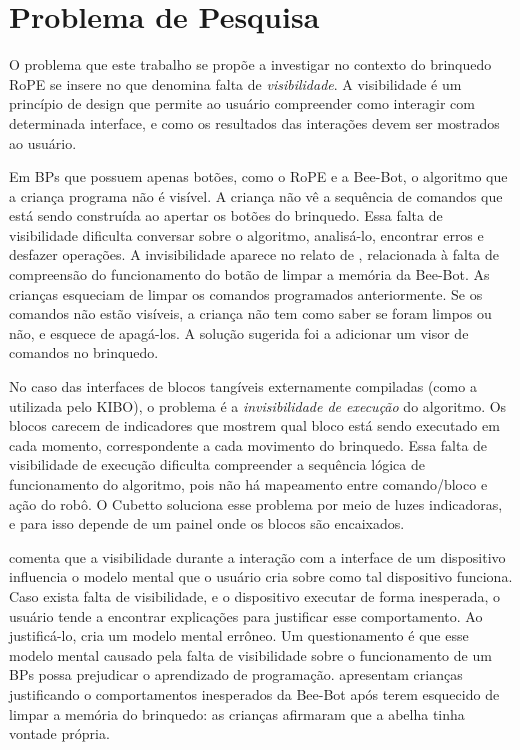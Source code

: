 \section{Problema de Pesquisa} \label{s_cintro_problema_pesquisa}

O problema que este trabalho se propõe a investigar no contexto do brinquedo RoPE se insere no que  denomina falta de \textit{visibilidade}. A visibilidade é um princípio de design que permite ao usuário compreender como interagir com determinada interface, e como os resultados das interações devem ser mostrados ao usuário.

Em BPs que possuem apenas botões, como o RoPE e a Bee-Bot, o algoritmo que a criança programa não é visível. A criança não vê a sequência de comandos que está sendo construída ao apertar os botões do brinquedo. Essa falta de visibilidade dificulta conversar sobre o algoritmo, analisá-lo, encontrar erros e desfazer operações. A invisibilidade aparece no relato de , relacionada à falta de compreensão do funcionamento do botão de limpar a memória da Bee-Bot. As crianças esqueciam de limpar os comandos programados anteriormente. Se os comandos não estão visíveis, a criança não tem como saber se foram limpos ou não, e esquece de apagá-los. A solução sugerida foi a adicionar um visor de comandos no brinquedo.

No caso das interfaces de blocos tangíveis externamente compiladas (como a utilizada pelo KIBO), o problema é a \textit{invisibilidade de execução} do algoritmo. Os blocos carecem de indicadores que mostrem qual bloco está sendo executado em cada momento, correspondente a cada movimento do brinquedo. Essa falta de visibilidade de execução dificulta compreender a sequência lógica de funcionamento do algoritmo, pois não há mapeamento entre comando/bloco e ação do robô. O Cubetto soluciona esse problema por meio de luzes indicadoras, e para isso depende de um painel onde os blocos são encaixados.

 comenta que a visibilidade durante a interação com a interface de um dispositivo influencia o modelo mental que o usuário cria sobre como tal dispositivo funciona. Caso exista falta de visibilidade, e o dispositivo executar de forma inesperada, o usuário tende a encontrar explicações para justificar esse comportamento. Ao justificá-lo, cria um modelo mental errôneo. Um questionamento é que esse modelo mental causado pela falta de visibilidade sobre o funcionamento de um BPs possa prejudicar o aprendizado de programação.  apresentam crianças justificando o comportamentos inesperados da Bee-Bot após terem esquecido de limpar a memória do brinquedo: as crianças afirmaram que a abelha tinha vontade própria.

